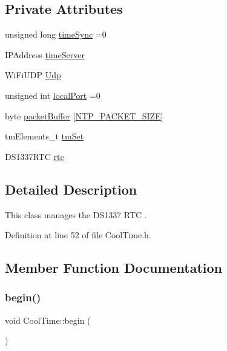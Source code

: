 \subsection*{Private Attributes}
\begin{DoxyCompactItemize}
\item 
unsigned long \hyperlink{class_cool_time_a9d032e76c3470a15b3bbbc52af6463f7}{time\+Sync} =0
\item 
I\+P\+Address \hyperlink{class_cool_time_ad2b9858f399108cb440dd1e908916f04}{time\+Server}
\item 
Wi\+Fi\+U\+DP \hyperlink{class_cool_time_a4e23216a8121ca79d0fb019f30884b92}{Udp}
\item 
unsigned int \hyperlink{class_cool_time_a2f777da44d7ba678be8185299e9b49d1}{local\+Port} =0
\item 
byte \hyperlink{class_cool_time_a27e6abc82a5c2f72161956967005bec7}{packet\+Buffer} \mbox{[}\hyperlink{_cool_time_8h_a56a6ea64006651b4f42adf713e244f06}{N\+T\+P\+\_\+\+P\+A\+C\+K\+E\+T\+\_\+\+S\+I\+ZE}\mbox{]}
\item 
tm\+Elements\+\_\+t \hyperlink{class_cool_time_ad33c2713c903ff064ad09c46406ae088}{tm\+Set}
\item 
D\+S1337\+R\+TC \hyperlink{class_cool_time_abd38f2384ff90692b1568d9db869412e}{rtc}
\end{DoxyCompactItemize}


\subsection{Detailed Description}
This class manages the D\+S1337 R\+TC . 

Definition at line 52 of file Cool\+Time.\+h.



\subsection{Member Function Documentation}
\mbox{\label{class_cool_time_ab1976cf718b950bc31e003c3323b8adb}} 
\subsubsection{\texorpdfstring{begin()}{begin()}}
{\footnotesize\ttfamily void Cool\+Time\+::begin (\begin{DoxyParamCaption}{ }\end{DoxyParamCaption})}

